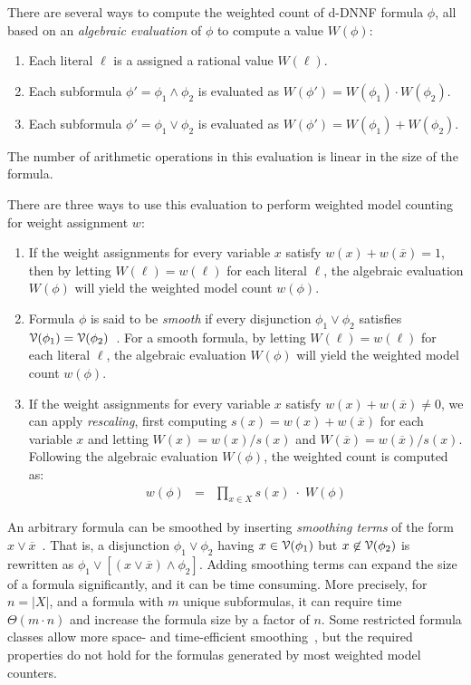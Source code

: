 \documentclass[letterpaper,USenglish,cleveref, autoref, thm-restate]{lipics-v2021}
\newcommand{\obar}[1]{\overline{#1}}
\newcommand{\lit}{\ell}
\newcommand{\varset}{X}
\newcommand{\dependencyset}{{\cal V}}
\begin{document}
There are several ways to compute the weighted count of d-DNNF formula $\phi$, all
based on an \emph{algebraic evaluation} of $\phi$ to compute a value $W(\phi)$:
\begin{enumerate}
\item Each literal $\lit$ is a assigned a rational value $W(\lit)$.
\item Each subformula $\phi' = \phi_1 \land \phi_2$ is evaluated as $W(\phi') = W(\phi_1) \cdot W(\phi_2)$.
\item Each subformula $\phi' = \phi_1 \lor \phi_2$ is evaluated as $W(\phi') = W(\phi_1) + W(\phi_2)$.
\end{enumerate}
The number of arithmetic operations in this evaluation is linear in the size of the formula.

There are three ways to use this evaluation to perform weighted model counting for weight assignment $w$:
\begin{enumerate}
\item If the weight assignments for every variable $x$ satisfy $w(x) + w(\obar{x}) = 1$,
  then by letting $W(\lit) = w(\lit)$ for each literal $\lit$, the algebraic evaluation $W(\phi)$ will yield the weighted model count $w(\phi)$.
\item Formula $\phi$ is said to be \emph{smooth} if every disjunction $\phi_1 \lor \phi_2$ satisfies
  $\dependencyset(\phi_1) = \dependencyset(\phi_2)$~\cite{darwiche:jancl:2001,darwiche:jair:2002}.  For a smooth formula, 
by letting $W(\lit) = w(\lit)$ for each literal $\lit$, the algebraic evaluation $W(\phi)$ will yield the weighted model count $w(\phi)$.
\item If the weight assignments for every variable $x$ satisfy $w(x) + w(\obar{x}) \not = 0$,
  we can apply \emph{rescaling}, first computing $s(x) = w(x) + w(\obar{x})$ for each variable $x$
  and letting $W(x) = w(x)/s(x)$ and $W(\obar{x}) = w(\obar{x})/s(x)$.  
  Following the algebraic evaluation $W(\phi)$, the weighted count is computed as:
  \begin{eqnarray}
w(\phi) &=& \prod_{x\in\varset} s(x) \; \cdot \; W(\phi) \label{eqn:rescale}
  \end{eqnarray}
\end{enumerate}

An arbitrary formula can be smoothed by inserting \emph{smoothing terms} of the form $x \lor \obar{x}$~\cite{darwiche:jancl:2001}.
That is,
  a disjunction $\phi_1 \lor \phi_2$ having $x \in \dependencyset(\phi_1)$ but
  $x \not\in \dependencyset(\phi_2)$ is rewritten as $\phi_1 \lor [(x \lor \obar{x}) \land \phi_2]$.
  Adding smoothing terms can expand the size of a formula significantly, and it can be time consuming.
  More precisely, for $n = |X|$, and a formula with $m$ unique subformulas, it can require time $\Theta(m\cdot n)$ and increase the formula size by a factor of $n$.
  Some restricted formula classes allow more space- and time-efficient smoothing~\cite{shih:neurips:2019}, but the required properties do not hold for the formulas generated by most weighted model counters.
  
\end{document}
